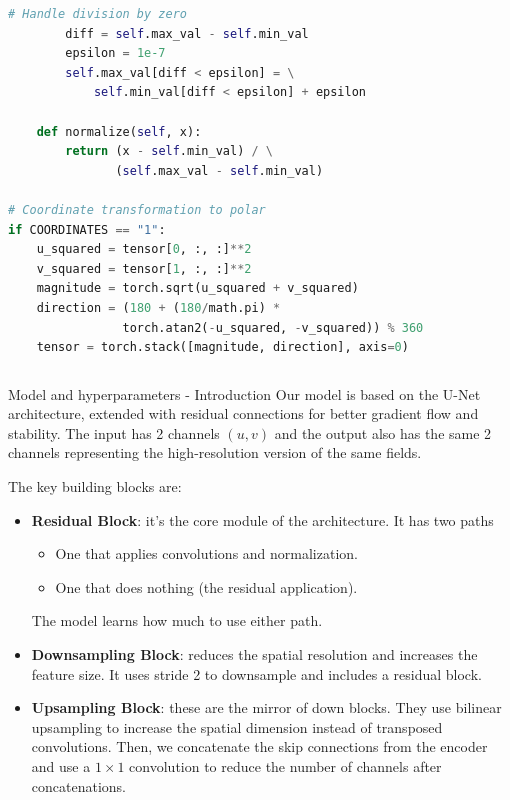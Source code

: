 \documentclass[8pt]{beamer}
\begin{document}
\begin{frame}[fragile]
\begin{columns}
\begin{column}{0.5\textwidth}
\begin{lstlisting}[language=Python, basicstyle=\ttfamily\tiny]
        # Handle division by zero
        diff = self.max_val - self.min_val
        epsilon = 1e-7
        self.max_val[diff < epsilon] = \
            self.min_val[diff < epsilon] + epsilon
        
    def normalize(self, x):
        return (x - self.min_val) / \
               (self.max_val - self.min_val)

# Coordinate transformation to polar
if COORDINATES == "1":
    u_squared = tensor[0, :, :]**2
    v_squared = tensor[1, :, :]**2
    magnitude = torch.sqrt(u_squared + v_squared)
    direction = (180 + (180/math.pi) * 
                torch.atan2(-u_squared, -v_squared)) % 360
    tensor = torch.stack([magnitude, direction], axis=0)
\end{lstlisting}
\end{column}
\end{columns}

\end{frame}



\begin{frame}{Model and hyperparameters - Introduction}
    Our model is based on the U-Net architecture, extended with residual connections for better gradient flow and stability.
    The input has 2 channels $(u,v)$ and the output also has the same 2 channels representing the high-resolution version of the same fields.

    The key building blocks are:
    \begin{itemize}
        \item \textbf{Residual Block}: it's the core module of the architecture. It has two paths
        \begin{itemize}
            \item One that applies convolutions and normalization.
            \item One that does nothing (the residual application).
        \end{itemize}
        The model learns how much to use either path.
        \item \textbf{Downsampling Block}: reduces the spatial resolution and increases the feature size. It uses stride 2 to downsample and includes a residual block.
        \item \textbf{Upsampling Block}: these are the mirror of down blocks. They use bilinear upsampling to increase the spatial dimension instead of transposed convolutions. Then, we concatenate  the skip connections from the encoder and use a $1\times 1$ convolution to reduce the number of channels after concatenations.
    \end{itemize}
    \end{frame}
\end{document}
